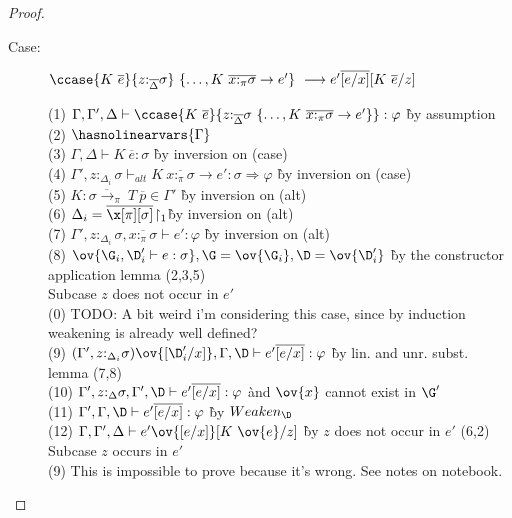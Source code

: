 \begin{proof}
\begin{description}
\item[Case:]
    $\ccase{K~\overline{e}}{z{:}_{\overline{\Delta}}\sigma}~\{\dots,K~\overline{x{:}_\pi\sigma}\to e'\}\ \longrightarrow e'\overline{[e/x]}[K~\overline{e}/z]$
\begin{tabbing}
(1) $\Gamma,\Gamma',\Delta \vdash \ccase{K~\overline{e}}{z{:}_{\overline{\Delta}}\sigma~\{\dots,K~\overline{x{:}_\pi\sigma}\to e'\}} : \varphi$ \` by assumption \\
(2) $\hasnolinearvars{\Gamma}$\\
(3) $\Gamma, \Delta \vdash K~\overline{e} : \sigma$ \` by inversion on (case) \\
(4) $\Gamma', z{:}_{\Delta_i}\sigma \vdash_{alt} K~\overline{x{:}_\pi\sigma} \to e' : \sigma \Longrightarrow \varphi$ \` by inversion on (case) \\
(5) $K : \overline{\sigma \to_\pi}~T~\overline{p} \in \Gamma'$ \` by inversion on (alt) \\
(6) $\Delta_i = \overline{\x[\pi][\sigma]}\!\upharpoonright_1$\` by inversion on (alt)\\
(7) $\Gamma',z{:}_{\Delta_i}\sigma,\overline{x{:}_\pi\sigma} \vdash e' : \varphi$ \` by inversion on (alt) \\
(8) $\ov{\G_i, \D'_i \vdash e : \sigma}, \G = \ov{\G_i}, \D = \ov{\D'_i}$ \` by the constructor application lemma (2,3,5) \\
Subcase $z$ does not occur in $e'$\\
(0) TODO: A bit weird i'm considering this case, since by induction weakening is already well defined?\\
(9) $(\Gamma', z{:}_{\Delta_i}\sigma)\ov{[\D'_i/x]}, \Gamma, \D \vdash e'\overline{[e/x]} : \varphi$ \` by lin. and unr. subst. lemma (7,8) \\
(10) $\Gamma', z{:}_{\Delta}\sigma, \Gamma', \D \vdash e'\overline{[e/x]} : \varphi$ \` and $\ov{x}$ cannot exist in $\G'$ \\
(11) $\Gamma', \Gamma, \D \vdash e'\overline{[e/x]} : \varphi$ \` by $Weaken_\D$\\
(12) $\Gamma, \Gamma', \Delta \vdash e'\ov{[e/x]}[K~\ov{e}/z]$ \` by $z$ does not occur in $e'$ (6,2) \\
Subcase $z$ occurs in $e'$\\
(9) This is impossible to prove because it's wrong. See notes on notebook.
\end{tabbing}


\end{description}
\end{proof}
